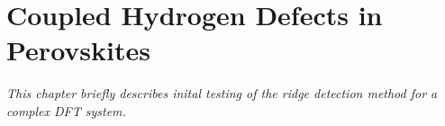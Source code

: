 \chapter{Coupled Hydrogen Defects in Perovskites}
\label{chap:perovskites}

\textit{This chapter briefly describes inital testing of the ridge detection method for a complex DFT system.}





